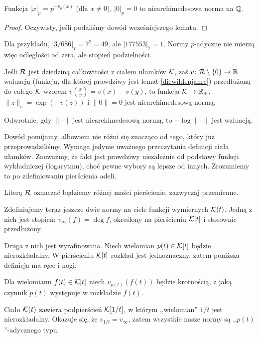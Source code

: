 \begin{fakt}
	Funkcja $|x|_p = p^{-v_p(x)}$ (dla $x \neq 0$), $|0|_p = 0$ to niearchimedesowa norma na $\mathbb Q$.
\end{fakt}

\begin{proof}
	Oczywisty, jeśli podaliśmy dowód wcześniejszego lematu.
\end{proof}

Dla przykładu, $|3/686|_7 = 7^2 = 49$, ale $|177553|_7 = 1$.
Normy $p$-adyczne nie mierzą więc odległości od zera, ale stopień podzielności.

\begin{fakt}
	Jeśli $\mathcal R$ jest dziedziną całkowitości z ciałem ułamków $\mathcal K$, zaś $v \colon \mathcal R \setminus \{0\} \to \mathbb R$ waluacją (funkcją, dla której prawdziwy jest lemat \ref{diewildenjahre}) przedłużoną do całego $\mathcal K$ wzorem $v(\frac xy) = v(x)-v(y)$, to funkcja $\mathcal K \to \mathbb R_+$, $\|z\|_v = \exp(-v(z))$ i $\|0\| = 0$ jest niearchimedesową normą.

	Odwrotnie, gdy $\|\cdot\|$ jest niearchimedesową normą, to $-\log \|\cdot\|$ jest waluacją.
\end{fakt}

Dowód pomijamy, albowiem nie różni się znacząco od tego, który już przeprowadziliśmy.
Wymaga jedynie uważnego przeczytania definicji ciała ułamków.
Zauważmy, że fakt jest prawdziwy niezależnie od podstawy funkcji wykładniczej (logarytmu), choć pewne wybory są lepsze od innych.
Zrozumiemy to po zdefiniowaniu pierścienia adeli.

Literą $\mathcal R$ oznaczać będziemy różnej maści pierścienie, zazwyczaj przemienne.

Zdefiniujemy teraz jeszcze dwie normy na ciele funkcji wymiernych $\mathcal K(t)$.
Jedną z nich jest stopień: $v_\infty(f) = \deg f$, określony na pierścieniu $\mathcal K[t]$ i stosownie przedłużony.

Druga z nich jest wyrafinowana.
Niech wielomian $p(t) \in \mathcal K[t]$ będzie nierozkładalny.
W pierścieniu $\mathcal K[t]$ rozkład jest jednoznaczny, zatem poniższa definicja ma ręce i nogi:

\begin{definicja}
	Dla wielomianu $f(t) \in \mathcal K[t]$ niech $v_{p(t)}(f(t))$ będzie krotnością, z jaką czynnik $p(t)$ występuje w rozkładzie $f(t)$.
\end{definicja}

Ciało $\mathcal K(t)$ zawiera podpierścień $\mathcal K[1/t]$, w którym ,,wielomian'' $1/t$ jest nierozkładalny.
Okazuje się, że $v_{1/t} = v_\infty$, zatem wszystkie nasze normy są ,,$p(t)$''-adycznego typu.

